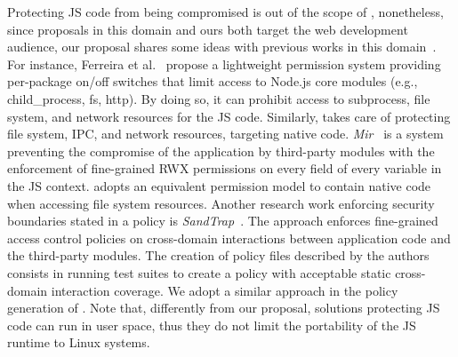 Protecting JS code from being compromised is out of the scope of \natisand,
nonetheless, since proposals in this domain and ours both target the
web development audience, our proposal shares some ideas with previous
works in this domain~\cite{vasilakis2021preventing, sandtrap,
  terrace2012javascript, ntousakis2021detecting}. For instance, Ferreira et al.~\cite{
  npm-malicious-update} propose a lightweight permission system providing
per-package on/off switches that limit access to Node.js core modules
(e.g., child\_process, fs, http). By doing so, it can prohibit access
to subprocess, file system, and network resources for the JS
code. Similarly, \natisand takes care of protecting file system, IPC, and
network resources, targeting native code. {\em Mir}~\cite{
  vasilakis2021preventing} is a system preventing the compromise of
the application by third-party modules with the enforcement of
fine-grained RWX permissions on every field of every variable in the
JS context. \natisand adopts an equivalent permission model to contain
native code when accessing file system resources. Another research work
enforcing security boundaries stated in a policy is {\em
  SandTrap}~\cite{sandtrap}. The approach enforces fine-grained
access control policies on cross-domain interactions between
application code and the third-party modules. The creation of policy
files described by the authors consists in running test suites to
create a policy with acceptable static cross-domain interaction
coverage. We adopt a similar approach in the policy generation of
\natisand. Note that, differently from our proposal, solutions protecting
JS code can run in user space, thus they do not limit the portability
of the JS runtime to Linux systems.

